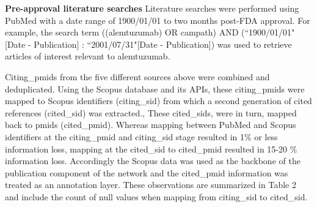 \documentclass[10pt,letterpaper]{article}
\begin{document}
\textbf{Pre-approval literature searches} Literature searches were performed using PubMed with a date range of 1900/01/01 to two months post-FDA approval. For example, the search term ((alemtuzumab) OR campath) AND (``1900/01/01"[Date - Publication] : ``2001/07/31"[Date - Publication]) was used to retrieve articles of interest relevant to alemtuzumab.

Citing\_pmids from the five different sources above  were combined and deduplicated. Using the Scopus database and its APIs, these citing\_pmids were mapped to Scopus identifiers (citing\_sid) from which a second generation of cited references (cited\_sid) was extracted., These cited\_sids, were in turn, mapped back to pmids (cited\_pmid). Whereas mapping between PubMed and Scopus identifiers at the citing\_pmid and citing\_sid stage resulted in 1\% or less information loss, mapping at the cited\_sid to cited\_pmid resulted in 15-20 \% information loss. Accordingly the Scopus data  was used as the backbone of the publication component of the network and the cited\_pmid information was treated as an annotation layer.  These observations are summarized in Table 2 and include the count of null values when mapping from citing\_sid to cited\_sid.
\end{document}
